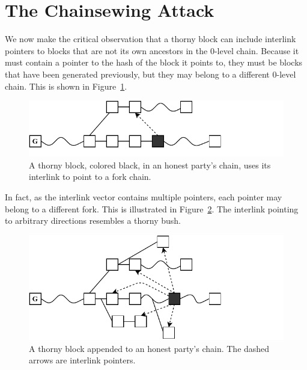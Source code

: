 \section{The Chainsewing Attack}\label{sec:attack}
We now make the critical observation that a thorny block can include interlink
pointers to blocks that are not its own ancestors in the $0$-level chain.
Because it must contain a pointer to the hash of the block it points to, they
must be blocks that have been generated previously, but they may belong to a
different $0$-level chain. This is shown in Figure~\ref{fig:false_interlink}.

\begin{figure}[h]
	\begin{center}
		\includegraphics[width=0.9\columnwidth]{figures/false_interlink.pdf}
	\end{center}
    \caption{A thorny block, colored black, in an honest party's chain, uses its interlink to point to a fork chain.}
	\label{fig:false_interlink}
\end{figure}

In fact, as the interlink vector contains multiple pointers, each pointer may
belong to a different fork. This is illustrated in
Figure~\ref{fig:thorny_block}. The interlink pointing to arbitrary directions
resembles a thorny bush.

\begin{figure}[h]
	\begin{center}
		\includegraphics[width=0.9\columnwidth]{figures/thorny_block.pdf}
	\end{center}
	\caption{A thorny block appended to an honest party's chain.
	The dashed arrows are interlink pointers.}
	\label{fig:thorny_block}
\end{figure}

